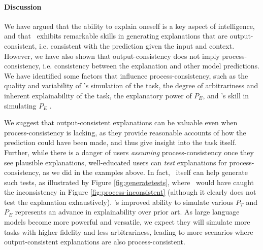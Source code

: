

\paragraph{Discussion}
We have argued that the ability to explain oneself is a key aspect of intelligence, and that \DV\ exhibits remarkable skills in generating explanations that are output-consistent, i.e. consistent with the prediction given the input and context.
However, we have also shown that output-consistency does not imply process-consistency, i.e. consistency between the explanation and other model predictions. 
We have identified some factors that influence process-consistency, such as the quality and variability of \DV's simulation of the task, the degree of arbitrariness and inherent explainability of the task, the explanatory power of $P_E$, and \DV's skill in simulating $P_E$ .
 

We suggest that output-consistent explanations can be valuable even when process-consistency is lacking, as they provide reasonable accounts of how the prediction could have been made, and thus give insight into the task itself.
Further, while there is a danger of users \emph{assuming} process-consistency once they see plausible explanations, well-educated users can \emph{test} explanations for process-consistency, as we did in the examples above.
In fact, \DV\ itself can help generate such tests, as illustrated by Figure \ref{fig:generatetests}, where \DV\ would have caught the inconsistency in Figure \ref{fig:process-inconsistent} (although it clearly does not test the explanation exhaustively).
% 
{\DV}'s improved ability to simulate various $P_T$ and $P_E$ represents an advance in explainability over prior art. As large language models become more powerful and versatile, we expect they will simulate more tasks with higher fidelity and less arbitrariness, leading to more scenarios where output-consistent explanations are also process-consistent.

